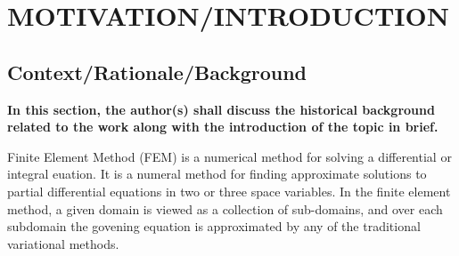




\chapter{MOTIVATION/INTRODUCTION}

\section{{\bf{Context/Rationale/Background}}}
{\bf\color{red}In this section, the author(s) shall discuss the  historical background related to the work along with the introduction of the topic in brief.}

Finite Element Method (FEM) is a numerical method for solving a differential or integral euation. It is a numeral method for finding approximate solutions to partial differential equations in two or three space variables. In the finite element method, a given domain is viewed as a collection of sub-domains, and over each subdomain the govening equation is approximated by any of the traditional variational methods.



